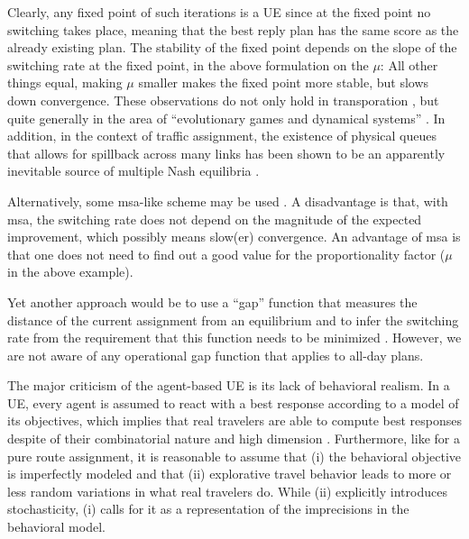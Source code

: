 Clearly, any fixed point of such iterations is a UE since at the
fixed point no switching takes place, meaning that the best reply plan
has the same score as the already existing plan.  
%
The stability of the fixed point depends on the slope of the switching
rate at the fixed point, in the above formulation on the $\mu$: All
other things equal, making $\mu$ smaller makes the fixed point more
stable, but slows down convergence. 
%
These observations do not only hold in transporation \citep[e.g.,][]{watling-2003},
but quite generally in the area of ``evolutionary
games and dynamical systems'' \citep{HofbSigmBook}. 
%
In addition, in the context of
traffic assignment, the existence of physical queues that allows for 
spillback across many links has been shown to be an apparently inevitable
source of multiple Nash equilibria \citep[][]{daganzo-1998}.

Alternatively, some \gls{msa}-like scheme
may be used \citep{liu-2007}.
A disadvantage is that, with \gls{msa}, the
switching rate does not depend on the magnitude of the expected
improvement, which possibly means slow(er) convergence.  An advantage
of \gls{msa} is that one does not need to find out a good value for the
proportionality factor ($\mu$ in the above example).  

Yet another approach would be to use a ``gap'' function that measures the
distance of the current assignment from an equilibrium and to infer
the switching rate from the requirement that this function needs to
be minimized 
\citep{LuMahmassaniZhou2009GapDue,zhang-2008}.
However, we are not aware of any operational gap function that applies to all-day plans.

The major criticism of the agent-based UE is its lack of behavioral realism.
In a UE, every agent is assumed to react with a best response 
according to a model of its objectives, which implies 
that real travelers are able to compute best responses
despite of their combinatorial nature and high dimension
\citep{bowman-1998}.
Furthermore, like for a pure route assignment, it
is reasonable to assume that (i) the behavioral objective is
imperfectly modeled and that (ii) explorative travel behavior leads
to more or less random variations in what real travelers do.
While (ii) explicitly introduces stochasticity, (i) calls for it as a
representation of the imprecisions in the behavioral model.

